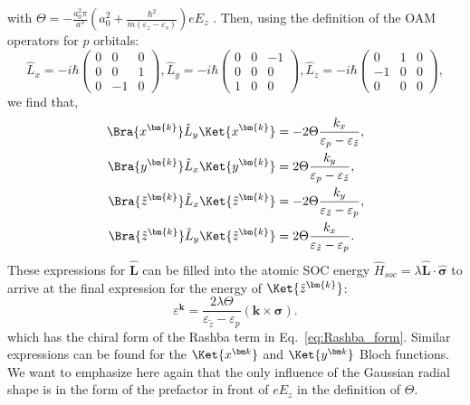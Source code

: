 with $\Theta = -\frac{a_0^2 \pi}{a^3}\left(a_0^2 + \frac{\hbar^2}{m(\varepsilon_z - \varepsilon_s)}\right) e E_z$ .
Then, using the definition of the OAM operators for $p$ orbitals:
\begin{equation}
	\hat{L}_x =-i\hbar\left(\begin{matrix}0&0&0\\0&0&1\\0&-1&0\end{matrix}\right), \hat{L}_y = -i\hbar \left(\begin{matrix}0&0&-1\\0&0&0\\1&0&0\end{matrix}\right), \hat{L}_z =-i\hbar\left(\begin{matrix}0&1&0\\-1&0&0\\0&0&0\end{matrix}\right),
\end{equation}
we find that,
\begin{align}
	\label{eq:oam_from_k}
	\Bra{x^{\bm{k}}} \hat{L}_y \Ket{x^{\bm{k}}} &= -2 \Theta \frac{k_x}{\varepsilon_p - \varepsilon_{\tilde{z}}},\\
	\Bra{y^{\bm{k}}} \hat{L}_x \Ket{y^{\bm{k}}} &= 2 \Theta \frac{k_y}{\varepsilon_p - \varepsilon_{\tilde{z}}},\\
	\Bra{\tilde{z}^{\bm{k}}} \hat{L}_x \Ket{\tilde{z}^{\bm{k}}} &= - 2 \Theta \frac{k_y}{\varepsilon_{\tilde{z}} - \varepsilon_p},\\ 
	\Bra{\tilde{z}^{\bm{k}}} \hat{L}_y \Ket{\tilde{z}^{\bm{k}}} &= 2 \Theta \frac{k_x}{\varepsilon_{\tilde{z}}-\varepsilon_p}\label{eq:oam_from_k_final}.
\end{align}
These expressions for $\hat{\bm{L}}$ can be filled into the atomic SOC energy $\hat{H}_{soc}= \lambda \hat{\bm{L}} \cdot \hat{\bm{\sigma}}$ to arrive at the final expression for the energy of $\Ket{\tilde{z}^{\bm{k}}}$:
\begin{equation}
	\label{eq:Rashba_from_OAM}
	\varepsilon^{\bm{k}} = \frac{2 \lambda \Theta}{\varepsilon_{\tilde{z}}-\varepsilon_p}(\bm{k} \times \bm{\sigma}).
\end{equation}
which has the chiral form of the Rashba term in Eq.~\eqref{eq:Rashba_form}. Similar expressions can be found for the $\Ket{x^{\bm k}}$ and $\Ket{y^{\bm k}}$ Bloch functions.
We want to emphasize here again that the only influence of the Gaussian radial shape is in the form of the prefactor in front of $e E_z$ in the definition of $\Theta$.
